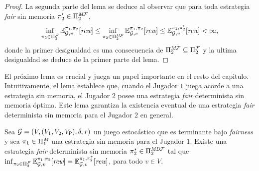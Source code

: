 \begin{proof}
  
  La segunda parte del lema se deduce al observar que para toda estrategia \textit{fair} sin memoria $\pi_{2}' \in \Pi^{\textit{M}\mathcal{F}}_{2}$,
  \[\inf_{\pi_{2} \in \Pi^{\mathcal{F}}_{2}} \mathbb{E}^{\pi_{1}, \pi_{2}}_{\mathcal{G},v}[\textit{rew}]
  \leq \inf_{\pi_{2} \in \Pi^{\textit{M}\mathcal{F}}_{2}} \mathbb{E}^{\pi_{1}, \pi_{2}}_{\mathcal{G},v}[\textit{rew}]
  \leq \mathbb{E}^{\pi_{1}, \pi_{2}'}_{\mathcal{G},v}[\textit{rew}] < \infty,\]
  donde la primer desigualdad es una consecuencia de
  $\Pi^{\textit{M}\mathcal{F}}_{2}\subseteq\Pi^{\mathcal{F}}_{2}$ y la ultima desigualdad
  se deduce de la primer parte del lema.  
  \qedhere
\end{proof}

El próximo lema es crucial y juega un papel importante en el resto del capitulo.  Intuitivamente, el lema establece que, cuando el Jugador $1$ juega acorde a una estrategia sin memoria, el Jugador $2$ posee una estrategia \textit{fair} determinista sin memoria óptima.
%
Este lema garantiza la existencia eventual de una estrategia \textit{fair} determinista sin memoria para el Jugador $2$ en general.
%
\begin{lemma}\label{lm:infima-in-dmf}%
  Sea $\mathcal{G}= (V, (V_1, V_2, V_{\mathsf{P}}), \delta, \mathit{r})$ un
  juego estocástico que es terminante bajo \textit{fairness} y sea
  $\pi_{1} \in \Pi^{\textit{M}}_{1}$ una estrategia sin memoria para el Jugador $1$.  Existe una estrategia \textit{fair} determinista sin memoria
  $\pi^*_{2}\in\Pi^{\textit{MD}\mathcal{F}}_{2}$ tal que
  $\inf_{\pi_{2} \in \Pi^{\mathcal{F}}_{2}} \mathbb{E}^{\pi_{1}, \pi_{2}}_{\mathcal{G},v}[\textit{rew}]
   =
   \mathbb{E}^{\pi_{1}, \pi^*_{2}}_{\mathcal{G},v}[\textit{rew}]$, para todo $v \in V$.
\end{lemma}
%
\iffalse
\iffalse
